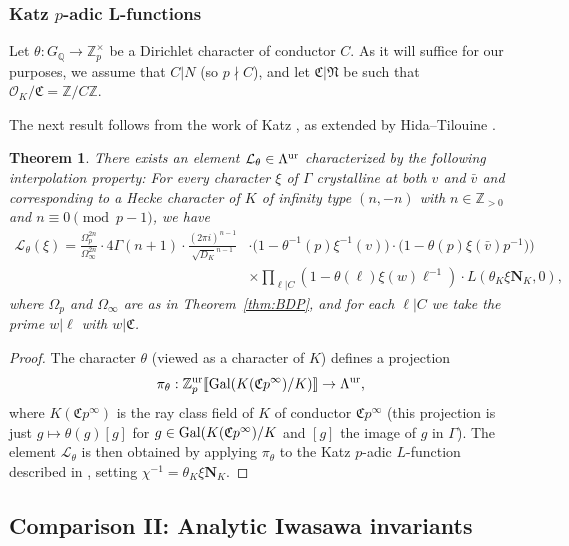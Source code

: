 \documentclass[10pt]{amsart}
\numberwithin{equation}{section}
\newtheorem{theorem}{Theorem}
\theoremstyle{definition}
\theoremstyle{remark}
\newcommand{\Z}{\mathbb{Z}}
\newcommand{\Lcal}{\mathcal{L}}
\newcommand{\bZ}{\mathbb{Z}}
\newcommand{\Q}{\mathbb{Q}}
\begin{document}
\subsubsection{Katz $p$-adic L-functions} 

Let $\theta:G_\Q\rightarrow\mathbb{Z}_p^\times$ be a Dirichlet character of conductor $C$. As it will suffice for our purposes, we assume that $C\vert N$ (so $p\nmid C$), and let $\mathfrak{C}\vert\mathfrak{N}$ be such that $\mathcal{O}_K/\mathfrak{C}=\Z/C\Z$. 

The next result follows from the work of Katz \cite{katz}, as extended by Hida--Tilouine \cite{hidatilouineI}.

\begin{theorem}\label{thm:Katz}
There exists an element $\mathcal{L}_{\theta}\in\Lambda^{\rm ur}$ characterized by the following interpolation property: For every character $\xi$ of $\Gamma$ crystalline at both $v$ and $\bar{v}$ and corresponding to a Hecke character of $K$ of infinity type $(n,-n)$ with $n\in\Z_{>0}$ and $n\equiv 0\pmod{p-1}$, we have
\begin{align*}
\Lcal_{\theta}(\xi)=\frac{\Omega_p^{2n}}{\Omega_\infty^{2n}}\cdot 4\Gamma(n+1)\cdot\frac{(2\pi i)^{n-1}}{\sqrt{D_K}^{n-1}}&\cdot\bigl(1-\theta^{-1}(p)\xi^{-1}(v)\bigr)\cdot\bigl(1-\theta(p)\xi(\bar{v})p^{-1})\bigr)\\
&\times\prod_{\ell\vert C}(1-\theta(\ell)\xi(w)\ell^{-1})\cdot L(\theta_{K}\xi\mathbf{N}_K,0),
\end{align*}
where $\Omega_p$ and $\Omega_\infty$ are as in Theorem~\ref{thm:BDP}, and for each $\ell\vert C$ we take the prime $w\vert\ell$ with $w\vert\mathfrak{C}$.
\end{theorem}

\begin{proof}
The character $\theta$  (viewed as a character of $K$) defines a projection 
\[
\pi_\theta:\bZ_p^{\rm ur}\llbracket{\rm Gal}(K(\mathfrak{C}p^\infty)/K)\rrbracket\rightarrow\Lambda^{\rm ur},
\]
where $K(\mathfrak{C}p^\infty)$ is the ray class field of $K$ of conductor $\mathfrak{C}p^\infty$
(this projection is just $g\mapsto \theta(g)[g]$ for $g\in {\rm Gal}(K(\mathfrak{C}p^\infty)/K$ 
and $[g]$ the image of $g$ in $\Gamma$).
The element $\Lcal_{\theta}$ is then obtained by applying $\pi_\theta$ to the Katz $p$-adic $L$-function described in \cite[Thm.~27]{kriz}, setting $\chi^{-1}=\theta_K\xi\mathbf{N}_K$. 
\end{proof}


\subsection{Comparison II: Analytic Iwasawa invariants}
\end{document}
